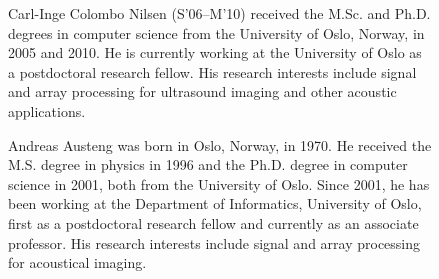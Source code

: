 \begin{figure}[!t]
  \begin{IEEEbiography}{Carl-Inge Colombo Nilsen}
  (S’06–M’10) received the M.Sc. and Ph.D. degrees in computer science from the University of Oslo, Norway, in 2005 and 2010. He is currently working at the University of Oslo as a postdoctoral research fellow. His research interests include signal and array processing for ultrasound imaging and other acoustic applications.
  \end{IEEEbiography}


  \begin{IEEEbiography}{Andreas Austeng}
  was born in Oslo, Norway, in 1970. He received the M.S. degree in physics in 1996 and the Ph.D. degree in computer science in 2001, both from the University of Oslo. Since 2001, he has been working at the Department of Informatics, University of Oslo, first as a postdoctoral research fellow and currently as an associate professor. His research interests include signal and array processing for acoustical imaging.
  \end{IEEEbiography}



\end{figure}
